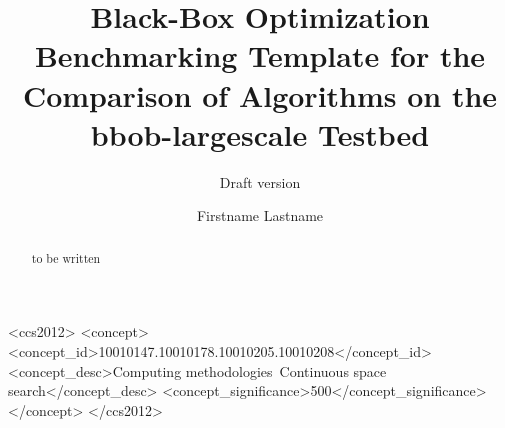\documentclass[sigconf]{acmart}
\newcommand{\bbobls}{{\ttfamily bbob-largescale}\xspace}
\begin{document}
\title{Black-Box Optimization Benchmarking Template for the Comparison of Algorithms on the \bbobls Testbed}
\renewcommand{\shorttitle}{Template to Compare Algorithms on the \bbobls Testbed}
\subtitle{Draft version}



\author{Firstname Lastname}
%
%
%
%
%
%
%

\renewcommand{\shortauthors}{Firstname Lastname et. al.}



\begin{abstract}
to be written
\end{abstract}


%
%
 \begin{CCSXML}
<ccs2012>
<concept>
<concept_id>10010147.10010178.10010205.10010208</concept_id>
<concept_desc>Computing methodologies~Continuous space search</concept_desc>
<concept_significance>500</concept_significance>
</concept>
</ccs2012>
\end{CCSXML}
\end{document}
